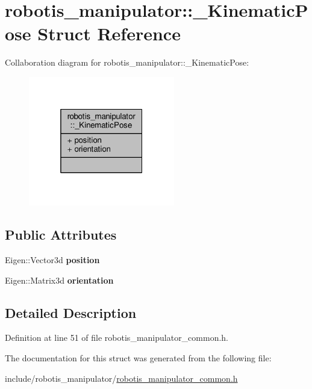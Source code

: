 \hypertarget{structrobotis__manipulator_1_1___kinematic_pose}{}\section{robotis\+\_\+manipulator\+:\+:\+\_\+\+Kinematic\+Pose Struct Reference}
\label{structrobotis__manipulator_1_1___kinematic_pose}


Collaboration diagram for robotis\+\_\+manipulator\+:\+:\+\_\+\+Kinematic\+Pose\+:
\nopagebreak
\begin{figure}[H]
\begin{center}
\leavevmode
\includegraphics[width=181pt]{structrobotis__manipulator_1_1___kinematic_pose__coll__graph}
\end{center}
\end{figure}
\subsection*{Public Attributes}
\begin{DoxyCompactItemize}
\item 
Eigen\+::\+Vector3d {\bfseries position}\hypertarget{structrobotis__manipulator_1_1___kinematic_pose_a323637037390a7f48b146d6782271595}{}\label{structrobotis__manipulator_1_1___kinematic_pose_a323637037390a7f48b146d6782271595}

\item 
Eigen\+::\+Matrix3d {\bfseries orientation}\hypertarget{structrobotis__manipulator_1_1___kinematic_pose_a4cb1009970fb8569390fc961c5aa5f9e}{}\label{structrobotis__manipulator_1_1___kinematic_pose_a4cb1009970fb8569390fc961c5aa5f9e}

\end{DoxyCompactItemize}


\subsection{Detailed Description}


Definition at line 51 of file robotis\+\_\+manipulator\+\_\+common.\+h.



The documentation for this struct was generated from the following file\+:\begin{DoxyCompactItemize}
\item 
include/robotis\+\_\+manipulator/\hyperlink{robotis__manipulator__common_8h}{robotis\+\_\+manipulator\+\_\+common.\+h}\end{DoxyCompactItemize}

